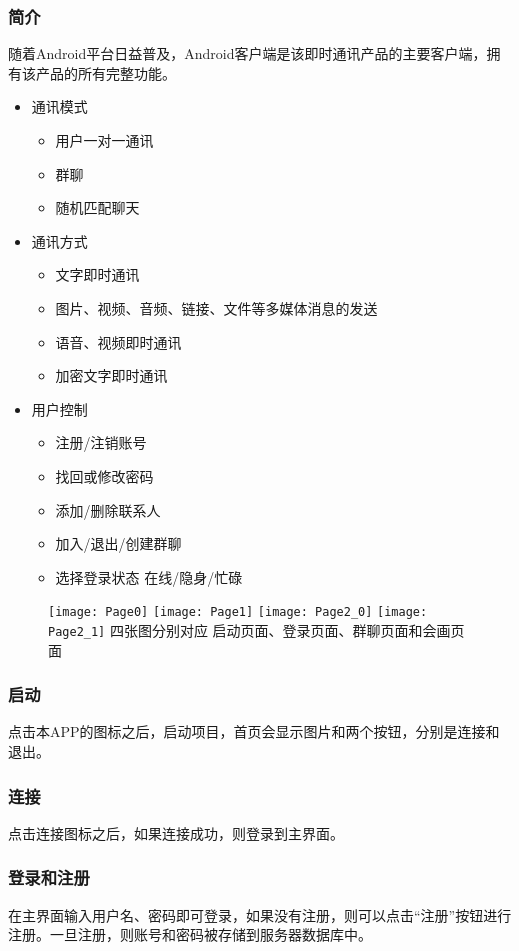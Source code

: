 \subsubsection{简介}
随着Android平台日益普及，Android客户端是该即时通讯产品的主要客户端，拥有该产品的所有完整功能。
\begin{itemize}
\item 通讯模式
  \begin{itemize}  	
  	\item 用户一对一通讯
  	\item 群聊
  	\item 随机匹配聊天
  \end{itemize}
\item 通讯方式
  \begin{itemize}
  	\item 文字即时通讯
  	\item 图片、视频、音频、链接、文件等多媒体消息的发送
  	\item 语音、视频即时通讯
  	\item 加密文字即时通讯
  \end{itemize}
\item 用户控制
  \begin{itemize}
  	\item 注册/注销账号
    \item 找回或修改密码
  	\item 添加/删除联系人
  	\item 加入/退出/创建群聊
    \item 选择登录状态 在线/隐身/忙碌 
  \end{itemize}
\end{itemize}
  \begin{figure}[!h]
	\texttt{[image: Page0]}
	\texttt{[image: Page1]}
	\texttt{[image: Page2\_0]}
	\texttt{[image: Page2\_1]}
	四张图分别对应 启动页面、登录页面、群聊页面和会画页面
	\label{fig:noted-figure}
   \end{figure}
\subsubsection{启动}
  点击本APP的图标之后，启动项目，首页会显示图片和两个按钮，分别是连接和退出。
\subsubsection{连接}
  点击连接图标之后，如果连接成功，则登录到主界面。
\subsubsection{登录和注册}
  在主界面输入用户名、密码即可登录，如果没有注册，则可以点击“注册”按钮进行注册。一旦注册，则账号和密码被存储到服务器数据库中。
